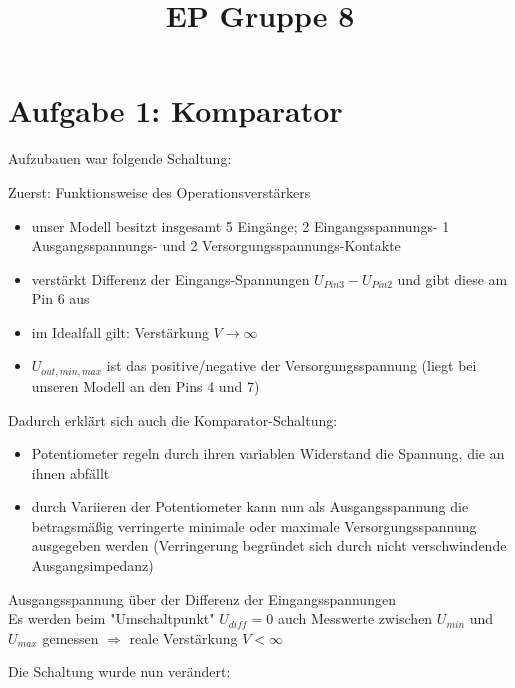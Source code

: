 \documentclass[compress,11pt]{beamer}
\title{EP Gruppe 8}
\begin{document}
\begin{frame}

\end{frame}

\section{Aufgabe 1: Komparator}
\begin{frame}
Aufzubauen war folgende Schaltung:
\end{frame}

\begin{frame}
\begin{block}{Zuerst: Funktionsweise des Operationsverstärkers}
\begin{itemize}
\item unser Modell besitzt insgesamt 5 Eingänge; 2 Eingangsspannungs- 1 Ausgangsspannungs- und 2 Versorgungsspannungs-Kontakte
\item verstärkt Differenz der Eingangs-Spannungen $U_{Pin3} - U_{Pin2}$ und gibt diese am Pin 6 aus
\item im Idealfall gilt: Verstärkung $V \rightarrow \infty$
\item $U_{out,min,max}$ ist das positive/negative der Versorgungsspannung (liegt bei unseren Modell an den Pins 4 und 7)
\end{itemize}

\end{block}
\end{frame}
\begin{frame}
Dadurch erklärt sich auch die Komparator-Schaltung:
\begin{itemize}
\item Potentiometer regeln durch ihren variablen Widerstand die Spannung, die an ihnen abfällt
\item durch Variieren der Potentiometer kann nun als Ausgangsspannung die betragsmäßig verringerte minimale oder maximale Versorgungsspannung ausgegeben werden (Verringerung begründet sich durch nicht verschwindende Ausgangsimpedanz)
\end{itemize}
\end{frame}
\begin{frame}
Ausgangsspannung über der Differenz der Eingangsspannungen\\ 
Es werden beim "Umschaltpunkt" $U_{diff} = 0$ auch Messwerte zwischen $U_{min}$ und $U_{max}$ gemessen $\Rightarrow$ reale Verstärkung $V < \infty$
\end{frame} 


\begin{frame}
Die Schaltung wurde nun verändert:\\

\end{frame}
\begin{frame}

\end{frame}
\end{document}
